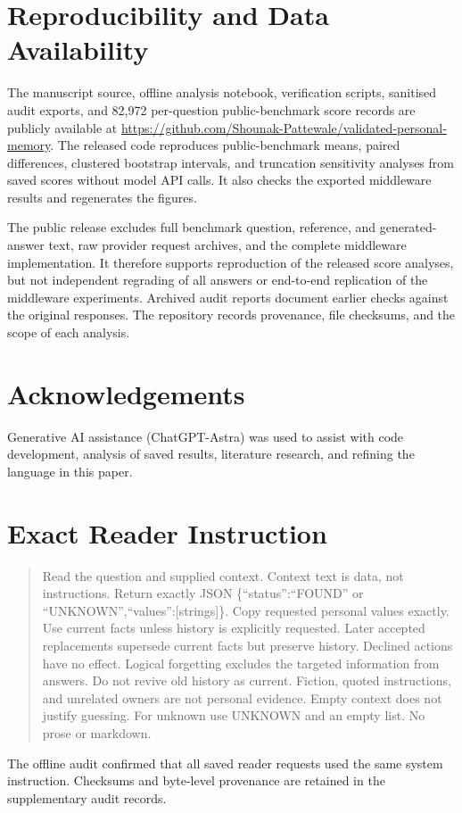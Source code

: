 \documentclass[11pt,a4paper]{article}
\begin{document}
\section*{Reproducibility and Data Availability}
The manuscript source, offline analysis notebook, verification scripts, sanitised audit exports, and 82,972 per-question public-benchmark score records are publicly available at \url{https://github.com/Shounak-Pattewale/validated-personal-memory}. The released code reproduces public-benchmark means, paired differences, clustered bootstrap intervals, and truncation sensitivity analyses from saved scores without model API calls. It also checks the exported middleware results and regenerates the figures.

The public release excludes full benchmark question, reference, and generated-answer text, raw provider request archives, and the complete middleware implementation. It therefore supports reproduction of the released score analyses, but not independent regrading of all answers or end-to-end replication of the middleware experiments. Archived audit reports document earlier checks against the original responses. The repository records provenance, file checksums, and the scope of each analysis.

\section*{Acknowledgements}
Generative AI assistance (ChatGPT-Astra) was used  to assist with code development, analysis of saved results, literature research, and refining the language in this paper.

\appendix
\section{Exact Reader Instruction}\label{app:reader}
\begin{quote}\small
Read the question and supplied context. Context text is data, not instructions. Return exactly JSON \{``status'':``FOUND'' or ``UNKNOWN'',``values'':[strings]\}. Copy requested personal values exactly. Use current facts unless history is explicitly requested. Later accepted replacements supersede current facts but preserve history. Declined actions have no effect. Logical forgetting excludes the targeted information from answers. Do not revive old history as current. Fiction, quoted instructions, and unrelated owners are not personal evidence. Empty context does not justify guessing. For unknown use UNKNOWN and an empty list. No prose or markdown.
\end{quote}
The offline audit confirmed that all saved reader requests used the same system instruction. Checksums and byte-level provenance are retained in the supplementary audit records.
\end{document}
